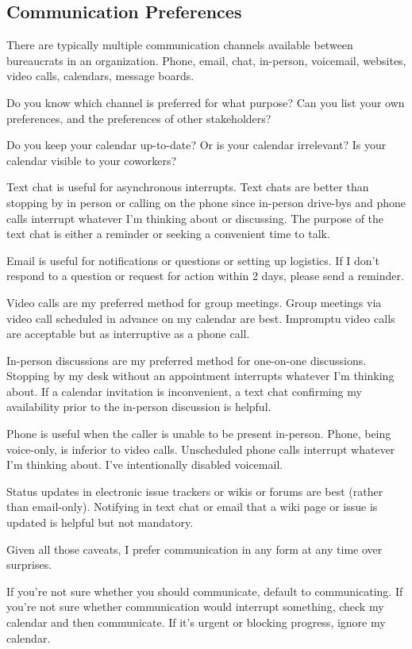 \subsection{Communication Preferences}

There are typically multiple communication channels available between bureaucrats in an organization. Phone, email, chat, in-person, voicemail, websites, video calls, calendars, message boards. 

Do you know which channel is preferred for what purpose? Can you list your own preferences, and the preferences of other stakeholders?

Do you keep your calendar up-to-date? Or is your calendar irrelevant? Is your calendar visible to your coworkers?

Text chat is useful for asynchronous interrupts. Text chats are better than stopping by in person or calling on the phone since in-person drive-bys and phone calls interrupt whatever I'm thinking about or discussing. The purpose of the text chat is either a reminder or seeking a convenient time to talk. 

Email is useful for notifications or questions or setting up logistics. If I don't respond to a question or request for action within 2 days, please send a reminder. 

Video calls are my preferred method for group meetings. Group meetings via video call scheduled in advance on my calendar are best. Impromptu video calls are acceptable but as interruptive as a phone call. 

In-person discussions are my preferred method for one-on-one discussions. Stopping by my desk  without an appointment interrupts whatever I'm thinking about. If a calendar invitation is inconvenient, a text chat confirming my availability prior to the in-person discussion is helpful. 

Phone is useful when the caller is unable to be present in-person. Phone, being voice-only, is inferior to video calls. Unscheduled phone calls interrupt whatever I'm thinking about. I've intentionally disabled voicemail. 

Status updates in electronic issue trackers or wikis or forums are best (rather than email-only). Notifying in text chat or email that a wiki page or issue is updated is helpful but not mandatory. 

Given all those caveats, I prefer communication in any form at any time over surprises. 

If you're not sure whether you should communicate, default to communicating. If you're not sure whether communication would interrupt something, check my calendar and then communicate. If it's urgent or blocking progress, ignore my calendar. 